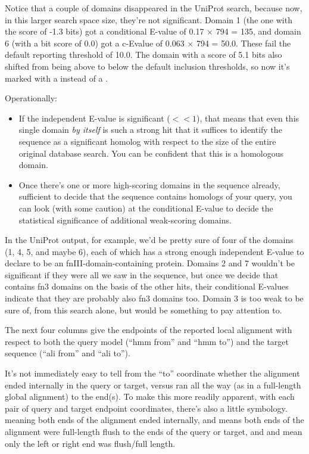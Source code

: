 Notice that a couple of domains disappeared in the UniProt search,
because now, in this larger search space size, they're not
significant. Domain 1 (the one with the score of -1.3 bits) got a
conditional E-value of 0.17 $\times$ 794 = 135, and domain 6 (with a
bit score of 0.0) got a c-Evalue of 0.063 $\times$ 794 = 50.0. These
fail the default reporting threshold of 10.0. The domain with a score
of 5.1 bits also shifted from being above to below the default
inclusion thresholds, so now it's marked with a  instead of a
\ccode{!}.

Operationally:

\begin{itemize}
\item If the independent E-value is significant ($<<1$), that means
that even this single domain \emph{by itself} is such a strong hit
that it suffices to identify the sequence as a significant homolog
with respect to the size of the entire original database search. You
can be confident that this is a homologous domain.

\item Once there's one or more high-scoring domains in the sequence
already, sufficient to decide that the sequence contains homologs of
your query, you can look (with some caution) at the conditional
E-value to decide the statistical significance of additional
weak-scoring domains.
\end{itemize}

In the UniProt output, for example, we'd be pretty sure of four of the
domains (1, 4, 5, and maybe 6), each of which has a strong enough
independent E-value to declare  to be an
fnIII-domain-containing protein. Domains 2 and 7 wouldn't be
significant if they were all we saw in the sequence, but once we decide
that  contains fn3 domains on the basis of the
other hits, their conditional E-values indicate that they are probably
also fn3 domains too. Domain 3 is too weak to be sure of, from this
search alone, but would be something to pay attention to.

The next four columns give the endpoints of the reported local
alignment with respect to both the query model (``hmm from'' and ``hmm
to'') and the target sequence (``ali from'' and ``ali to''). 

It's not immediately easy to tell from the ``to'' coordinate whether
the alignment ended internally in the query or target, versus ran all
the way (as in a full-length global alignment) to the end(s). To make
this more readily apparent, with each pair of query and target
endpoint coordinates, there's also a little symbology. 
meaning both ends of the alignment ended internally, and \prog{[]}
means both ends of the alignment were full-length flush to the ends of
the query or target, and \prog{[.} and \prog{.]} mean only the left or
right end was flush/full length. 

